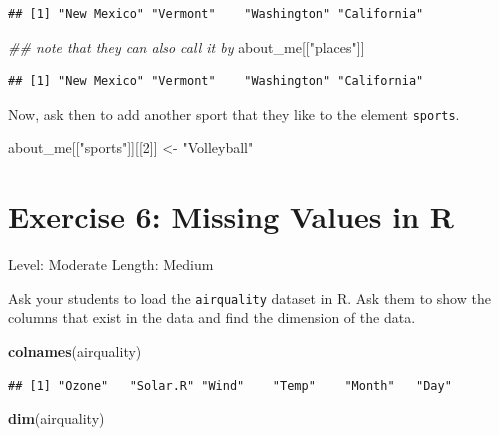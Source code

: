 \documentclass[]{book}
\newenvironment{Shaded}{\begin{snugshade}}{\end{snugshade}}
\newcommand{\CommentTok}[1]{\textcolor[rgb]{0.56,0.35,0.01}{\textit{#1}}}
\newcommand{\DecValTok}[1]{\textcolor[rgb]{0.00,0.00,0.81}{#1}}
\newcommand{\KeywordTok}[1]{\textcolor[rgb]{0.13,0.29,0.53}{\textbf{#1}}}
\newcommand{\NormalTok}[1]{#1}
\newcommand{\StringTok}[1]{\textcolor[rgb]{0.31,0.60,0.02}{#1}}
\begin{document}
\begin{verbatim}
## [1] "New Mexico" "Vermont"    "Washington" "California"
\end{verbatim}

\begin{Shaded}
\begin{Highlighting}[]
\CommentTok{## note that they can also call it by }
\NormalTok{about_me[[}\StringTok{"places"}\NormalTok{]]}
\end{Highlighting}
\end{Shaded}

\begin{verbatim}
## [1] "New Mexico" "Vermont"    "Washington" "California"
\end{verbatim}

Now, ask then to add another sport that they like to the element \texttt{sports}.

\begin{Shaded}
\begin{Highlighting}[]
\NormalTok{about_me[[}\StringTok{"sports"}\NormalTok{]][[}\DecValTok{2}\NormalTok{]] <-}\StringTok{ "Volleyball"}
\end{Highlighting}
\end{Shaded}

\hypertarget{exercise-6-missing-values-in-r}{%
\section*{Exercise 6: Missing Values in R}\label{exercise-6-missing-values-in-r}}

Level: Moderate
Length: Medium

Ask your students to load the \texttt{airquality} dataset in R. Ask them to show the columns that exist in the data and find the dimension of the data.

\begin{Shaded}
\begin{Highlighting}[]
\KeywordTok{colnames}\NormalTok{(airquality)}
\end{Highlighting}
\end{Shaded}

\begin{verbatim}
## [1] "Ozone"   "Solar.R" "Wind"    "Temp"    "Month"   "Day"
\end{verbatim}

\begin{Shaded}
\begin{Highlighting}[]
\KeywordTok{dim}\NormalTok{(airquality)}
\end{Highlighting}
\end{Shaded}
\end{document}
